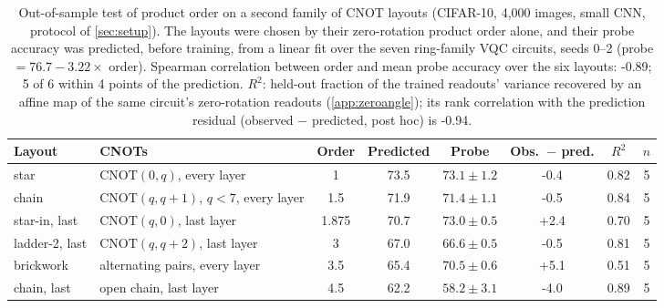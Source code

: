 \begin{table}[h]
\centering
\caption{Out-of-sample test of product order on a second family of CNOT layouts (CIFAR-10,
4,000 images, small CNN, protocol of \cref{sec:setup}). The layouts were chosen by their
zero-rotation product order alone, and their probe accuracy was predicted, before training,
from a linear fit over the seven ring-family VQC circuits, seeds 0--2 (probe $=76.7-3.22\times$ order).
Spearman correlation between order and mean probe accuracy over the six layouts: -0.89; 5 of 6 within 4 points of the prediction. $R^2$: held-out fraction of the trained readouts'
variance recovered by an affine map of the same circuit's zero-rotation readouts
(\cref{app:zeroangle}); its rank correlation with the prediction residual (observed $-$
predicted, post hoc) is -0.94.}
\label{tab:family}
\small
\begin{tabular}{llcccccc}
\toprule
Layout & CNOTs & Order & Predicted & Probe & Obs.\ $-$ pred. & $R^2$ & $n$ \\
\midrule
star & $\mathrm{CNOT}(0,q)$, every layer & 1 & 73.5 & $73.1 \pm 1.2$ & -0.4 & 0.82 & 5 \\
chain & $\mathrm{CNOT}(q,q{+}1)$, $q<7$, every layer & 1.5 & 71.9 & $71.4 \pm 1.1$ & -0.5 & 0.84 & 5 \\
star-in, last & $\mathrm{CNOT}(q,0)$, last layer & 1.875 & 70.7 & $73.0 \pm 0.5$ & +2.4 & 0.70 & 5 \\
ladder-2, last & $\mathrm{CNOT}(q,q{+}2)$, last layer & 3 & 67.0 & $66.6 \pm 0.5$ & -0.5 & 0.81 & 5 \\
brickwork & alternating pairs, every layer & 3.5 & 65.4 & $70.5 \pm 0.6$ & +5.1 & 0.51 & 5 \\
chain, last & open chain, last layer & 4.5 & 62.2 & $58.2 \pm 3.1$ & -4.0 & 0.89 & 5 \\
\bottomrule
\end{tabular}
\end{table}
